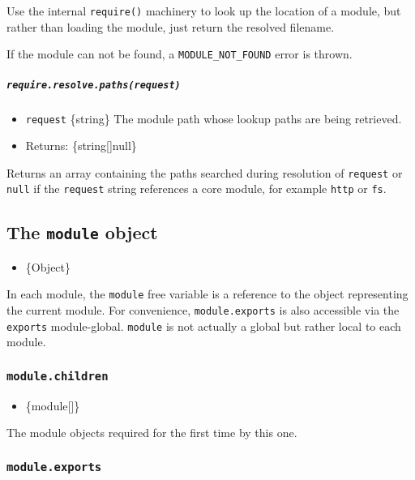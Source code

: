 Use the internal \texttt{require()} machinery to look up the location of
a module, but rather than loading the module, just return the resolved
filename.

If the module can not be found, a \texttt{MODULE\_NOT\_FOUND} error is
thrown.

\subparagraph{\texorpdfstring{\texttt{require.resolve.paths(request)}}{require.resolve.paths(request)}}\label{require.resolve.pathsrequest}

\begin{itemize}
\tightlist
\item
  \texttt{request} \{string\} The module path whose lookup paths are
  being retrieved.
\item
  Returns: \{string{[}{]}\textbar null\}
\end{itemize}

Returns an array containing the paths searched during resolution of
\texttt{request} or \texttt{null} if the \texttt{request} string
references a core module, for example \texttt{http} or \texttt{fs}.

\subsection{\texorpdfstring{The \texttt{module}
object}{The module object}}\label{the-module-object}

\begin{itemize}
\tightlist
\item
  \{Object\}
\end{itemize}

In each module, the \texttt{module} free variable is a reference to the
object representing the current module. For convenience,
\texttt{module.exports} is also accessible via the \texttt{exports}
module-global. \texttt{module} is not actually a global but rather local
to each module.

\subsubsection{\texorpdfstring{\texttt{module.children}}{module.children}}\label{module.children}

\begin{itemize}
\tightlist
\item
  \{module{[}{]}\}
\end{itemize}

The module objects required for the first time by this one.

\subsubsection{\texorpdfstring{\texttt{module.exports}}{module.exports}}\label{module.exports}

